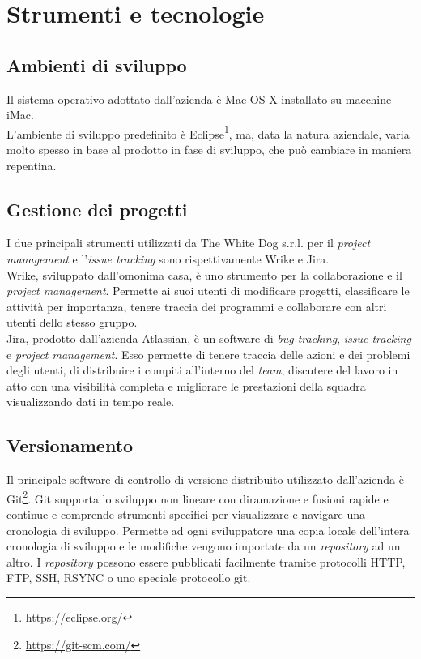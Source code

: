 \section{Strumenti e tecnologie}

\subsection{Ambienti di sviluppo}

Il sistema operativo adottato dall'azienda è Mac OS X installato su macchine iMac. \\
L'ambiente di sviluppo predefinito è Eclipse\footnote[6]{\url{https://eclipse.org/}}, ma, data la natura aziendale, varia molto spesso in base al prodotto in fase di sviluppo, che può cambiare in maniera repentina. 

\subsection{Gestione dei progetti}

I due principali strumenti utilizzati da The White Dog s.r.l. per il \textit{project management} e l'\textit{issue tracking} sono rispettivamente Wrike e Jira.\\
Wrike, sviluppato dall'omonima casa, è uno strumento per la collaborazione e il \textit{project management}. Permette ai suoi utenti di modificare progetti, classificare le attività per importanza, tenere traccia dei programmi e collaborare con altri utenti dello stesso gruppo.\\
Jira, prodotto dall'azienda Atlassian, è un software di \textit{bug tracking}, \textit{issue tracking} e \textit{project management}. Esso permette di tenere traccia delle azioni e dei problemi degli utenti, di distribuire i compiti all'interno del \textit{team}, discutere del lavoro in atto con una visibilità completa e migliorare le prestazioni della squadra visualizzando dati in tempo reale.

\subsection{Versionamento}

Il principale software di controllo di versione distribuito utilizzato dall'azienda è Git\footnote[7]{\url{https://git-scm.com/}}. Git supporta lo sviluppo non lineare con diramazione e fusioni rapide e continue e comprende strumenti specifici per visualizzare e navigare una cronologia di sviluppo. Permette ad ogni sviluppatore una copia locale dell'intera cronologia di sviluppo e le modifiche vengono importate da un \textit{repository} ad un altro. I \textit{repository} possono essere pubblicati facilmente tramite protocolli HTTP, FTP, SSH, RSYNC o uno speciale protocollo git.

